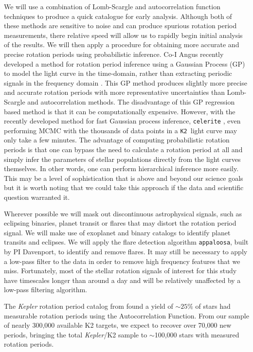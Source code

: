 \documentclass[12pt]{article}
\newcommand{\Kepler}{\textsl{Kepler}\xspace}
\newcommand{\ktwo}{{\tt K2}}
\begin{document}
We will use a combination of Lomb-Scargle and autocorrelation function
techniques to produce a quick catalogue for early analysis.
Although both of these methods are sensitive to noise and can produce spurious
rotation period measurements, there relative speed will allow us to rapidly
begin initial analysis of the results.
We will then apply a procedure for obtaining more accurate and precise
rotation periods using probabilistic inference.
Co-I Angus recently developed a method for rotation period inference using a
Gaussian Process (GP) to model the light curve in the time-domain, rather than
extracting periodic signals in the frequency domain \citet{angus2016c}.
This GP method produces slightly more precise and accurate rotation periods
with more representative uncertainties than Lomb-Scargle and autocorrelation
methods.
The disadvantage of this GP regression based method is that it can be
computationally expensive.
However, with the recently developed method for fast Gaussian process
inference, {\tt celerite} \citep{foreman-mackey2017}, even performing MCMC
with the thousands of data points in a \ktwo\ light curve may only take a few
minutes.
The advantage of computing probabilistic rotation periods is that one can
bypass the need to calculate a rotation period at all and simply infer the
parameters of stellar populations directly from the light curves themselves.
In other words, one can perform hierarchical inference more easily.
This may be a level of sophistication that is above and beyond our science
goals but it is worth noting that we could take this approach if the data and
scientific question warranted it.

Wherever possible we will mask out discontinuous astrophysical signals, such as
eclipsing binaries, planet transit or flares that may distort the rotation
period signal.
We will make use of exoplanet and binary catalogs to identify planet transits
and eclipses.
We will apply the flare detection algorithm {\tt appaloosa}, built by PI Davenport,
to identify and remove flares.
It may still be necessary to apply a low-pass filter to the data in order to
remove high frequency features that we miss.
Fortunately, most of the stellar rotation signals of interest for this study
have timescales longer than around a day and will be relatively unaffected by
a low-pass filtering algorithm.

The \Kepler rotation period catalog from \citet{mcquillan2014} found a yield
of $\sim25\%$ of stars had measurable rotation periods using the
Autocorrelation Function. From our sample of nearly 300,000 available K2 targets, we
expect to recover over 70,000 new periods, bringing the total
\Kepler/K2 sample to $\sim$100,000 stars with measured rotation periods.
\end{document}
